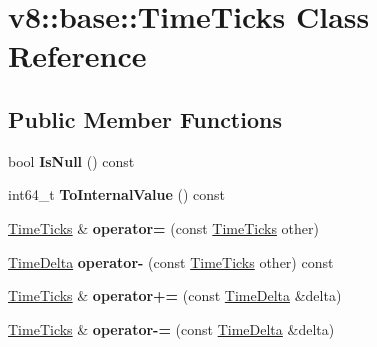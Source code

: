 \hypertarget{classv8_1_1base_1_1_time_ticks}{}\section{v8\+:\+:base\+:\+:Time\+Ticks Class Reference}
\label{classv8_1_1base_1_1_time_ticks}
\subsection*{Public Member Functions}
\begin{DoxyCompactItemize}
\item 
bool {\bfseries Is\+Null} () const \hypertarget{classv8_1_1base_1_1_time_ticks_a473b6231bb9495338a63410bfb699e1e}{}\label{classv8_1_1base_1_1_time_ticks_a473b6231bb9495338a63410bfb699e1e}

\item 
int64\+\_\+t {\bfseries To\+Internal\+Value} () const \hypertarget{classv8_1_1base_1_1_time_ticks_ad024b0caead66c25396883f3907b2ba1}{}\label{classv8_1_1base_1_1_time_ticks_ad024b0caead66c25396883f3907b2ba1}

\item 
\hyperlink{classv8_1_1base_1_1_time_ticks}{Time\+Ticks} \& {\bfseries operator=} (const \hyperlink{classv8_1_1base_1_1_time_ticks}{Time\+Ticks} other)\hypertarget{classv8_1_1base_1_1_time_ticks_a7e9982486b9abfc6bfb358a72c2a909e}{}\label{classv8_1_1base_1_1_time_ticks_a7e9982486b9abfc6bfb358a72c2a909e}

\item 
\hyperlink{classv8_1_1base_1_1_time_delta}{Time\+Delta} {\bfseries operator-\/} (const \hyperlink{classv8_1_1base_1_1_time_ticks}{Time\+Ticks} other) const \hypertarget{classv8_1_1base_1_1_time_ticks_a150d201e2358112d9955e35057644da9}{}\label{classv8_1_1base_1_1_time_ticks_a150d201e2358112d9955e35057644da9}

\item 
\hyperlink{classv8_1_1base_1_1_time_ticks}{Time\+Ticks} \& {\bfseries operator+=} (const \hyperlink{classv8_1_1base_1_1_time_delta}{Time\+Delta} \&delta)\hypertarget{classv8_1_1base_1_1_time_ticks_ab451bf2b9b51d8d6bde5679748df7144}{}\label{classv8_1_1base_1_1_time_ticks_ab451bf2b9b51d8d6bde5679748df7144}

\item 
\hyperlink{classv8_1_1base_1_1_time_ticks}{Time\+Ticks} \& {\bfseries operator-\/=} (const \hyperlink{classv8_1_1base_1_1_time_delta}{Time\+Delta} \&delta)\hypertarget{classv8_1_1base_1_1_time_ticks_a2d9533ffcd7ffa2685bac627bad3cea2}{}\label{classv8_1_1base_1_1_time_ticks_a2d9533ffcd7ffa2685bac627bad3cea2}


\end{DoxyCompactItemize}
